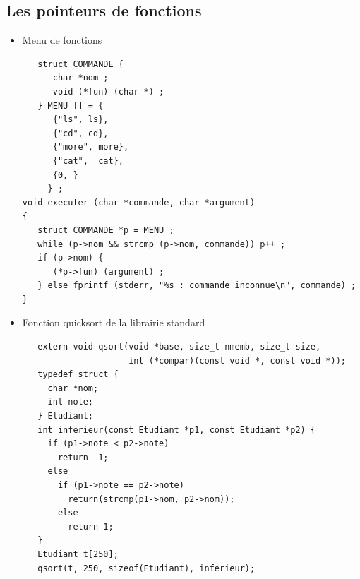 \begin{frame}
    \section{Les pointeurs de fonctions}

    \begin{itemize}
      \item Menu de fonctions 
{\normalsize
\begin{verbatim}
   struct COMMANDE {
      char *nom ;
      void (*fun) (char *) ;
   } MENU [] = {
      {"ls", ls},
      {"cd", cd},
      {"more", more},
      {"cat",  cat},
      {0, }
     } ;
void executer (char *commande, char *argument)
{
   struct COMMANDE *p = MENU ;
   while (p->nom && strcmp (p->nom, commande)) p++ ;
   if (p->nom) {
      (*p->fun) (argument) ;
   } else fprintf (stderr, "%s : commande inconnue\n", commande) ;
}
\end{verbatim}
}
     \item Fonction quicksort de la librairie standard
{\normalsize
\begin{verbatim}
   extern void qsort(void *base, size_t nmemb, size_t size,
                     int (*compar)(const void *, const void *));
   typedef struct {
     char *nom;
     int note;
   } Etudiant;
   int inferieur(const Etudiant *p1, const Etudiant *p2) {
     if (p1->note < p2->note)
       return -1;
     else
       if (p1->note == p2->note)
         return(strcmp(p1->nom, p2->nom));
       else
         return 1;
   }
   Etudiant t[250];
   qsort(t, 250, sizeof(Etudiant), inferieur);
\end{verbatim}
}
    \end{itemize}


\end{frame}

